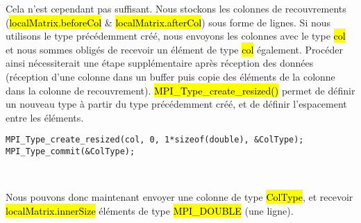 \documentclass[a4paper,table]{article}
\begin{document}
Cela n'est cependant pas suffisant. Nous stockons les colonnes de recouvrements
(\hl{localMatrix.beforeCol} \& \hl{localMatrix.afterCol}) sous forme de lignes.
Si nous utilisons le type précédemment créé, nous envoyons les colonnes avec
le type \hl{col} et nous sommes obligés de recevoir un élément de type \hl{col}
également. Procéder ainsi nécessiterait une étape supplémentaire après
réception des données (réception d'une colonne dans un buffer puis copie des
éléments de la colonne dans la colonne de recouvrement).
\hl{MPI\_Type\_create\_resized()} permet de définir un nouveau type à partir du
type précédemment créé, et de définir l'espacement entre les éléments.\\

\begin{lstlisting}
MPI_Type_create_resized(col, 0, 1*sizeof(double), &ColType);
MPI_Type_commit(&ColType);
\end{lstlisting}
\

Nous pouvons donc maintenant envoyer une colonne de type \hl{ColType}, et
recevoir \hl{localMatrix.innerSize} éléments de type \hl{MPI\_DOUBLE}
(une ligne).
\end{document}

